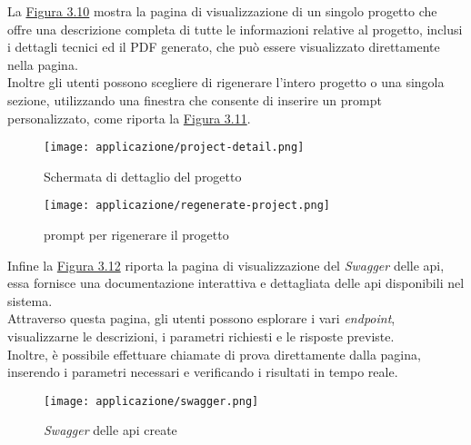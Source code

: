 \pagebreak
\noindent La {\hyperref[fig:project-detail]{Figura 3.10}} mostra la pagina di visualizzazione di un singolo progetto che offre una descrizione completa di tutte le informazioni relative al progetto, inclusi i dettagli tecnici ed il PDF generato, che può essere visualizzato direttamente nella pagina. \\ 

\noindent Inoltre gli utenti possono scegliere di rigenerare l’intero progetto o una singola sezione, utilizzando una finestra che consente di inserire un \gls{prompt} personalizzato, come riporta la {\hyperref[fig:regenerate-project]{Figura 3.11}}.\\
\begin{figure}[H]
    \centering
    \texttt{[image: applicazione/project-detail.png]}
    \caption{Schermata di dettaglio del progetto}
    \label{fig:project-detail}
\end{figure}

\begin{figure}[H]
    \centering
    \texttt{[image: applicazione/regenerate-project.png]}
    \caption{\gls{prompt} per rigenerare il progetto}
    \label{fig:regenerate-project}
\end{figure}

\pagebreak
\noindent Infine la {\hyperref[fig:swagger]{Figura 3.12}} riporta la pagina di visualizzazione del \textit{Swagger} delle \gls{api}, essa fornisce una documentazione interattiva e dettagliata delle \gls{api} disponibili nel sistema. \\
Attraverso questa pagina, gli utenti possono esplorare i vari \textit{endpoint}, visualizzarne le descrizioni, i parametri richiesti e le risposte previste. \\
Inoltre, è possibile effettuare chiamate di prova direttamente dalla pagina, inserendo i parametri necessari e verificando i risultati in tempo reale. 
\begin{figure}[H]
    \centering
    \texttt{[image: applicazione/swagger.png]}
    \caption{\textit{Swagger} delle \gls{api} create}
    \label{fig:swagger}
\end{figure}